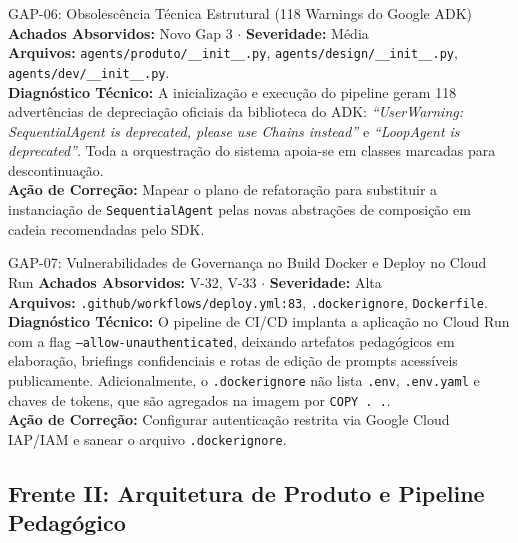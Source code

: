 \documentclass[11pt,a4paper]{article}
\begin{document}
\begin{gapbox}{GAP-06: Obsolescência Técnica Estrutural (118 Warnings do Google ADK)}
\textbf{Achados Absorvidos:} Novo Gap 3 $\cdot$ \textbf{Severidade:} Média\\
\textbf{Arquivos:} \texttt{agents/produto/\_\_init\_\_.py}, \texttt{agents/design/\_\_init\_\_.py}, \texttt{agents/dev/\_\_init\_\_.py}.\\
\textbf{Diagnóstico Técnico:} A inicialização e execução do pipeline geram 118 advertências de depreciação oficiais da biblioteca do ADK: \textit{``UserWarning: SequentialAgent is deprecated, please use Chains instead''} e \textit{``LoopAgent is deprecated''}. Toda a orquestração do sistema apoia-se em classes marcadas para descontinuação.\\
\textbf{Ação de Correção:} Mapear o plano de refatoração para substituir a instanciação de \texttt{SequentialAgent} pelas novas abstrações de composição em cadeia recomendadas pelo SDK.
\end{gapbox}

\begin{gapbox}{GAP-07: Vulnerabilidades de Governança no Build Docker e Deploy no Cloud Run}
\textbf{Achados Absorvidos:} V-32, V-33 $\cdot$ \textbf{Severidade:} Alta\\
\textbf{Arquivos:} \texttt{.github/workflows/deploy.yml:83}, \texttt{.dockerignore}, \texttt{Dockerfile}.\\
\textbf{Diagnóstico Técnico:} O pipeline de CI/CD implanta a aplicação no Cloud Run com a flag \texttt{--allow-unauthenticated}, deixando artefatos pedagógicos em elaboração, briefings confidenciais e rotas de edição de prompts acessíveis publicamente. Adicionalmente, o \texttt{.dockerignore} não lista \texttt{.env}, \texttt{.env.yaml} e chaves de tokens, que são agregados na imagem por \texttt{COPY . .}.\\
\textbf{Ação de Correção:} Configurar autenticação restrita via Google Cloud IAP/IAM e sanear o arquivo \texttt{.dockerignore}.
\end{gapbox}

\newpage
\subsection{Frente II: Arquitetura de Produto e Pipeline Pedagógico}
\end{document}

